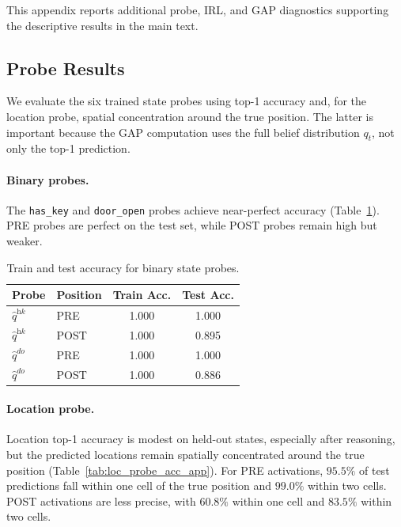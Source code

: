 \documentclass[10pt,twocolumn]{article}
\begin{document}
This appendix reports additional probe, IRL, and GAP diagnostics supporting the
descriptive results in the main text.

\subsection{Probe Results}
\label{app:probe_results}

We evaluate the six trained state probes using top-1 accuracy and, for the
location probe, spatial concentration around the true position. The latter is
important because the GAP computation uses the full belief distribution
$q_t$, not only the top-1 prediction.

\paragraph{Binary probes.}
The \texttt{has\_key} and \texttt{door\_open} probes achieve near-perfect
accuracy (Table~\ref{tab:binary_probe_acc_app}). PRE probes are perfect on the
test set, while POST probes remain high but weaker.

\begin{table}[!ht]
\centering
\small
\begin{tabular}{llcc}
\toprule
\textbf{Probe} & \textbf{Position} & \textbf{Train Acc.} & \textbf{Test Acc.} \\
\midrule
$\hat{q}^{\textit{hk}}$  & PRE  & 1.000 & 1.000 \\
$\hat{q}^{\textit{hk}}$  & POST & 1.000 & 0.895 \\
$\hat{q}^{\textit{do}}$  & PRE  & 1.000 & 1.000 \\
$\hat{q}^{\textit{do}}$  & POST & 1.000 & 0.886 \\
\bottomrule
\end{tabular}
\caption{Train and test accuracy for binary state probes.}
\label{tab:binary_probe_acc_app}
\end{table}

\paragraph{Location probe.}
Location top-1 accuracy is modest on held-out states, especially after
reasoning, but the predicted locations remain spatially concentrated around the
true position (Table~\ref{tab:loc_probe_acc_app}). For PRE activations,
$95.5\%$ of test predictions fall within one cell of the true position and
$99.0\%$ within two cells. POST activations are less precise, with $60.8\%$
within one cell and $83.5\%$ within two cells.
\end{document}
